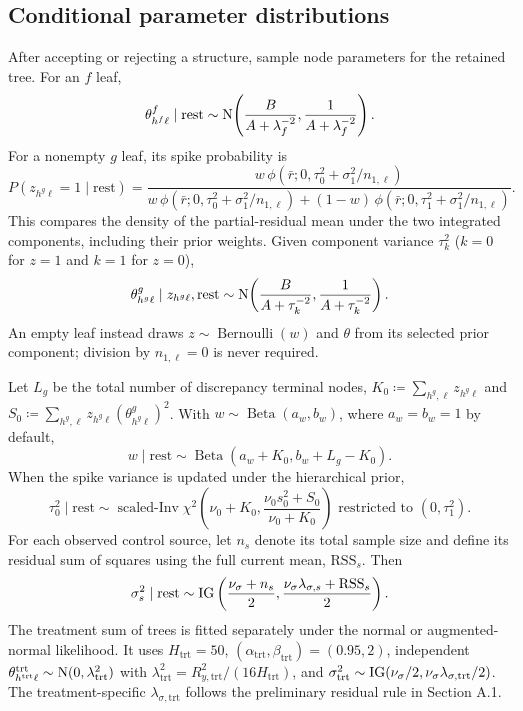 \subsection{Conditional parameter distributions}\label{sec:A.5}
After accepting or rejecting a structure, sample node parameters for the retained tree. For an $f$ leaf,
\begin{equation}
\theta^f_{h^f\ell}\mid\text{rest}\sim
\mathrm{N}\!\left(\frac{B}{A+\lambda_f^{-2}},\frac{1}{A+\lambda_f^{-2}}\right).
\end{equation}
For a nonempty $g$ leaf, its spike probability is
\begin{equation}\label{eq:spikeposterior}
P(z_{h^g\ell}=1\mid\text{rest})=
\frac{w\,\phi(\bar r;0,\tau_0^2+\sigma_1^2/n_{1,\ell})}
{w\,\phi(\bar r;0,\tau_0^2+\sigma_1^2/n_{1,\ell})+(1-w)\,\phi(\bar r;0,\tau_1^2+\sigma_1^2/n_{1,\ell})}.
\end{equation}
This compares the density of the partial-residual mean under the two integrated components, including their prior weights. Given component variance $\tau_k^2$ ($k=0$ for $z=1$ and $k=1$ for $z=0$),
\begin{equation}
\theta^g_{h^g\ell}\mid z_{h^g\ell},\text{rest}\sim
\mathrm{N}\!\left(\frac{B}{A+\tau_k^{-2}},\frac{1}{A+\tau_k^{-2}}\right).
\end{equation}
An empty leaf instead draws $z\sim\operatorname{Bernoulli}(w)$ and $\theta$ from its selected prior component; division by $n_{1,\ell}=0$ is never required.

Let $L_g$ be the total number of discrepancy terminal nodes, $K_0\coloneqq \sum_{h^g,\ell}z_{h^g\ell}$ and $S_0\coloneqq \sum_{h^g,\ell}z_{h^g\ell}(\theta^g_{h^g\ell})^2$. With $w\sim\operatorname{Beta}(a_w,b_w)$, where $a_w=b_w=1$ by default,
\begin{equation}
w\mid\text{rest}\sim\operatorname{Beta}(a_w+K_0,b_w+L_g-K_0).
\end{equation}
When the spike variance is updated under the hierarchical prior,
\begin{equation}
\tau_0^2\mid\text{rest}\sim
\operatorname{scaled\text{-}Inv}\chi^2\!\left(
\nu_0+K_0,\frac{\nu_0s_0^2+S_0}{\nu_0+K_0}\right)
\text{ restricted to }(0,\tau_1^2).
\end{equation}
For each observed control source, let $n_{s}$ denote its total sample size and define its residual sum of squares using the full current mean, $\mathrm{RSS}_{s}$. Then
\begin{equation}
\sigma_{s}^2\mid\text{rest}\sim
\operatorname{IG}\left(\frac{\nu_\sigma+n_{s}}{2},\frac{\nu_\sigma\lambda_{\sigma,s}+\mathrm{RSS}_{s}}{2}\right).
\end{equation}
The treatment sum of trees is fitted separately under the normal or augmented-normal likelihood. It uses $H_{\mathrm{trt}}=50$, $(\alpha_{\mathrm{trt}},\beta_{\mathrm{trt}})=(0.95,2)$, independent $\theta^{\mathrm{trt}}_{h^{\mathrm{trt}}\ell}\sim\mathrm{N}(0,\lambda_{\mathrm{trt}}^2)$ with $\lambda_{\mathrm{trt}}^2=R_{y,\mathrm{trt}}^2/(16H_{\mathrm{trt}})$, and $\sigma_{\mathrm{trt}}^2\sim\operatorname{IG}(\nu_\sigma/2,\nu_\sigma\lambda_{\sigma,\mathrm{trt}}/2)$. The treatment-specific $\lambda_{\sigma,\mathrm{trt}}$ follows the preliminary residual rule in Section A.1.

